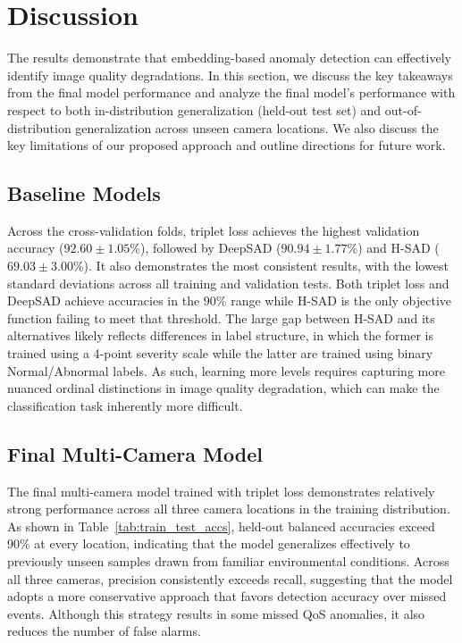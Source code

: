 \documentclass[remotesensing,article,submit,moreauthors]{Definitions/mdpi}
\begin{document}
\section{Discussion}

The results demonstrate that embedding-based anomaly detection can effectively identify image quality degradations. In this section, we discuss the key takeaways from the final model performance and analyze the final model's performance with respect to both in-distribution generalization (held-out test set) and out-of-distribution generalization across unseen camera locations. We also discuss the key limitations of our proposed approach and outline directions for future work. 

\subsection{Baseline Models}
Across the cross-validation folds, triplet loss achieves the highest validation accuracy ($92.60 \pm 1.05\%$), followed by \ac{DeepSAD} ($90.94 \pm 1.77\%$) and \ac{H-SAD} ($69.03 \pm 3.00\%$). It also demonstrates the most consistent results, with the lowest standard deviations across all training and validation tests. Both triplet loss and \ac{DeepSAD} achieve accuracies in the $90\%$ range while \ac{H-SAD} is the only objective function failing to meet that threshold. The large gap between \ac{H-SAD} and its alternatives likely reflects differences in label structure, in which the former is trained using a 4-point severity scale while the latter are trained using binary Normal/Abnormal labels. As such, learning more levels requires capturing more nuanced ordinal distinctions in image quality degradation, which can make the classification task inherently more difficult. 

\subsection{Final Multi-Camera Model}
The final multi-camera model trained with triplet loss demonstrates relatively strong performance across all three camera locations in the training distribution. As shown in Table~\ref{tab:train_test_accs}, held-out balanced accuracies exceed 90\% at every location, indicating that the model generalizes effectively to previously unseen samples drawn from familiar environmental conditions. Across all three cameras, precision consistently exceeds recall, suggesting that the model adopts a more conservative approach that favors detection accuracy over missed events. Although this strategy results in some missed \ac{QoS} anomalies, it also reduces the number of false alarms. 
\end{document}
